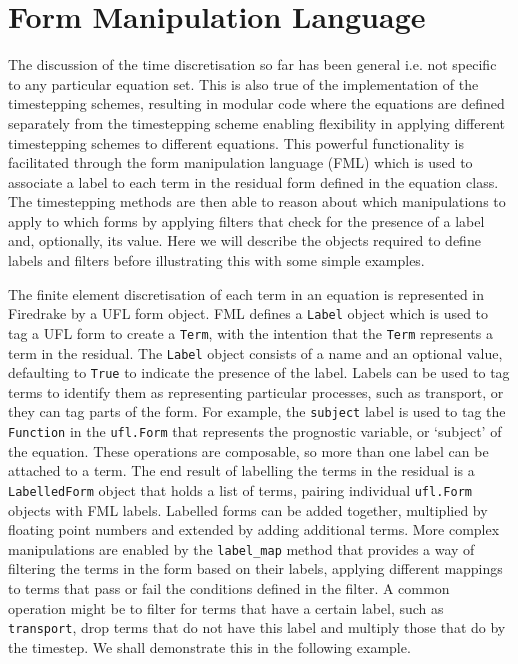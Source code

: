 \documentclass[journal abbreviation, manuscript]{copernicus}
\begin{document}
\section{Form Manipulation Language}
\label{sec: FML}
The discussion of the time discretisation so far has been general i.e.
not specific to any particular equation set. This is also true of the
implementation of the timestepping schemes, resulting in modular code
where the equations are defined separately from the timestepping
scheme enabling flexibility in applying different timestepping schemes
to different equations. This powerful functionality is facilitated
through the form manipulation language (FML) which is used to
associate a label to each term in the residual form defined in the
equation class. The timestepping methods are then able to reason about
which manipulations to apply to which forms by applying filters that
check for the presence of a label and, optionally, its value. Here we
will describe the objects required to define labels and filters before
illustrating this with some simple examples.

The finite element discretisation of each term in an equation is
represented in Firedrake by a UFL form object. FML defines a
\texttt{Label} object which is used to tag a UFL form to create a
\texttt{Term}, with the intention that the \texttt{Term} represents a
term in the residual. The \texttt{Label} object consists of a name and
an optional value, defaulting to \texttt{True} to indicate the
presence of the label. Labels can be used to tag terms to identify
them as representing particular processes, such as transport, or they
can tag parts of the form. For example, the \texttt{subject} label is
used to tag the \texttt{Function} in the \texttt{ufl.Form} that
represents the prognostic variable, or `subject' of the
equation. These operations are composable, so more than one label can
be attached to a term. The end result of labelling the terms in the
residual is a \texttt{LabelledForm} object that holds a list of terms,
pairing individual \texttt{ufl.Form} objects with FML labels. Labelled
forms can be added together, multiplied by floating point numbers and
extended by adding additional terms. More complex manipulations are
enabled by the \texttt{label\_map} method that provides a way of
filtering the terms in the form based on their labels, applying
different mappings to terms that pass or fail the conditions defined
in the filter. A common operation might be to filter for terms that
have a certain label, such as \texttt{transport}, drop terms that do
not have this label and multiply those that do by the timestep. We
shall demonstrate this in the following example.
\end{document}
